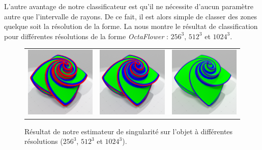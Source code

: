 L'autre avantage de notre classificateur est qu'il ne nécessite d'aucun
paramètre autre que l'intervalle de rayons. De ce fait, il est alors simple de
classer des zones quelque soit la résolution de la forme. La
 nous montre le résultat de classification pour
différentes résolutions de la forme \emph{OctaFlower} : $256^3$, $512^3$ et
$1024^3$.

\begin{figure}[ht]
  \begin{center}
    \setlength{\tabcolsep}{1pt}
    \begin{tabular}{c c c}
      \includegraphics[width=4.5cm]{images/Feature/OctaFlower_256_II_scale} &
      \includegraphics[width=4.5cm]{images/Feature/OctaFlower_512_II_scale} &
      \includegraphics[width=4.5cm]{images/Feature/OctaFlower_1024_II_scale}
    \end{tabular}
    \caption{Résultat de notre estimateur de singularité sur l'objet \OctaFlower à différentes résolutions ($256^3$, $512^3$ et $1024^3$).\label{fig:feature-octa}}
  \end{center}
\end{figure}


